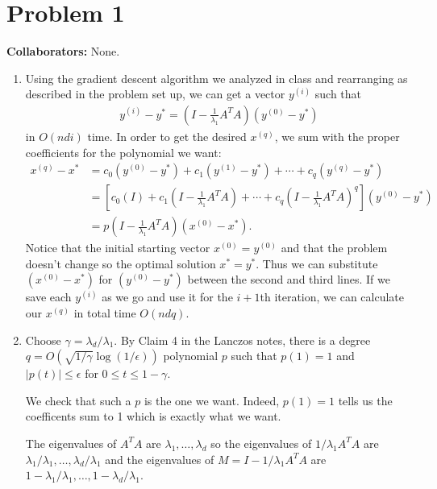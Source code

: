 
\section*{Problem 1}
\textbf{Collaborators:} None.
\medskip

\begin{enumerate}
    \item Using the gradient descent algorithm
    we analyzed in class and rearranging as described in
    the problem set up, we can get a vector $y^{(i)}$
    such that
    \begin{align}
        y^{(i)} - y^* = (I - \frac{1}{\lambda_1}A^T A) (y^{(0)}-y^*)
        \nonumber
    \end{align}
    in $O(ndi)$ time.
    In order to get the desired $x^{(q)}$, we sum
    with the proper coefficients for the polynomial we want:
    \begin{align}
        x^{(q)}-x^* &=
        c_0(y^{(0)}-y^*) + c_1(y^{(1)}-y^*) + \cdots +
        c_q(y^{(q)}-y^*) \nonumber \\
        &=\left[ c_0(I) + c_1 (I - \frac{1}{\lambda_1}A^T A)
        + \cdots + c_q (I - \frac{1}{\lambda_1}A^T A)^q
        \right ] (y^{(0)}-y^*) \nonumber \\
        &=p(I- \frac{1}{\lambda_1}A^T A)(x^{(0)}-x^*).
        \nonumber
    \end{align}
    Notice that the initial starting vector $x^{(0)}=y^{(0)}$
    and that the problem doesn't change so the optimal solution
    $x^*=y^*$.
    Thus we can substitute $(x^{(0)}-x^*)$ for $(y^{(0)}-y^*)$
    between the second and third lines.
    If we save each $y^{(i)}$ as we go and use it for the $i+1$th
    iteration, we can calculate our $x^{(q)}$ in total
    time $O(ndq)$.

    \item Choose $\gamma = \lambda_d/\lambda_1$.
    By Claim 4 in the Lanczos notes,
    there is a degree $q=O(\sqrt{1/\gamma}\log(1/\epsilon))$
    polynomial $p$ such that $p(1)=1$ and $|p(t)|\leq\epsilon$
    for $0\leq t \leq 1-\gamma$.

    We check that such a $p$ is the one we want.
    Indeed, $p(1)=1$ tells us the coefficents sum to 1 which is
    exactly what we want.
    
    The eigenvalues of $A^T A$ are $\lambda_1,\ldots,\lambda_d$
    so the eigenvalues of $1/\lambda_1 A^T A$ are
    $\lambda_1/\lambda_1, \ldots, \lambda_d/\lambda_1$
    and the eigenvalues of $M=I-1/\lambda_1 A^T A$ are 
    $1-\lambda_1/\lambda_1, \ldots, 1-\lambda_d/\lambda_1$.


\end{enumerate}
